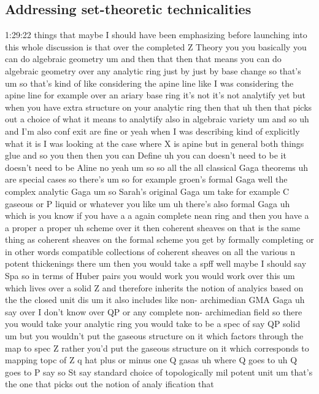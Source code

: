 \subsection{\ufs Addressing set-theoretic technicalities}
\begin{unfinished}{1:29:22}
things that maybe I should have been
emphasizing before launching into this
whole discussion is that over the
completed Z Theory you you basically you
can do algebraic
geometry
um and then that then that means you can
do algebraic geometry over any analytic
ring just by just by base change so
that's um so that's kind of like
considering the apine line like I was
considering the apine line for example
over an ariary base ring it's not it's
not analytify yet but when you have
extra structure on your analytic ring
then that uh then that picks out a
choice of what it means to analytify
also in algebraic
variety um and
so
uh and I'm also conf exit are fine or
yeah when I was describing kind of
explicitly what it is I was looking at
the case where X is apine but in general
both things glue and so you then then
you can Define uh you can doesn't need
to be it doesn't need to be Aline no
yeah
um so so all the all classical Gaga
theorems
uh are special
cases so
there's um so for example groen's formal
Gaga well the complex analytic
Gaga um so Sarah's original Gaga um take
for example C gaseous or P liquid or
whatever you
like
um uh there's also formal
Gaga uh which is you know if you have a
a again complete nean ring and then you
have a a proper a proper uh scheme over
it then coherent sheaves on that is the
same thing as coherent sheaves on the
formal scheme you get by formally
completing or in other words compatible
collections of coherent sheaves on all
the various n potent thickenings there
um then you would take a spff well maybe
I should say
Spa so in terms of Huber pairs you would
work you would work over this um which
lives over a solid
Z and therefore inherits the notion of
analyics based on
the the closed unit
dis
um it also includes like non-
archimedian GMA
Gaga uh say over I don't know over QP or
any complete non- archimedian field so
there you would take your analytic ring
you would take to be a spec of say QP
solid
um but you wouldn't put the gaseous
structure on it which factors through
the map to spec Z rather you'd put the
gaseous structure on it which
corresponds to mapping topc of Z q hat
plus or minus one Q
gasas uh where Q goes
to uh Q goes to P say so St say standard
choice of topologically mil potent
unit um that's the one that picks out
the notion of analy ification that

\end{unfinished}
